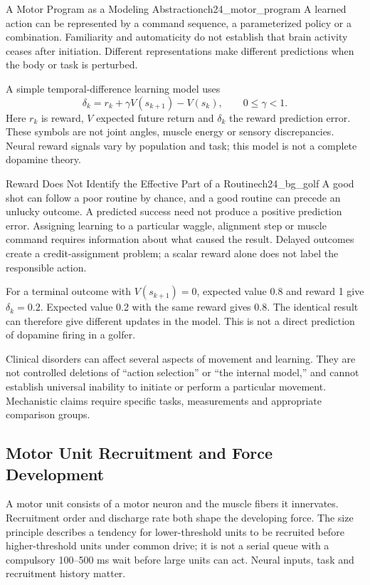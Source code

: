 \begin{definition}{A Motor Program as a Modeling Abstraction}{ch24_motor_program}
A learned action can be represented by a command sequence, a parameterized policy or a combination. Familiarity and automaticity do not establish that brain activity ceases after initiation. Different representations make different predictions when the body or task is perturbed.
\end{definition}

A simple temporal-difference learning model uses
\[
\delta_k=r_k+\gamma V(s_{k+1})-V(s_k),\qquad 0\leq\gamma<1.
\]
Here $r_k$ is reward, $V$ expected future return and $\delta_k$ the reward prediction error. These symbols are not joint angles, muscle energy or sensory discrepancies. Neural reward signals vary by population and task; this model is not a complete dopamine theory.

\begin{example}{Reward Does Not Identify the Effective Part of a Routine}{ch24_bg_golf}
A good shot can follow a poor routine by chance, and a good routine can precede an unlucky outcome. A predicted success need not produce a positive prediction error. Assigning learning to a particular waggle, alignment step or muscle command requires information about what caused the result. Delayed outcomes create a credit-assignment problem; a scalar reward alone does not label the responsible action.

For a terminal outcome with $V(s_{k+1})=0$, expected value 0.8 and reward 1 give $\delta_k=0.2$. Expected value 0.2 with the same reward gives 0.8. The identical result can therefore give different updates in the model. This is not a direct prediction of dopamine firing in a golfer.
\end{example}

Clinical disorders can affect several aspects of movement and learning. They are not controlled deletions of ``action selection'' or ``the internal model,'' and cannot establish universal inability to initiate or perform a particular movement. Mechanistic claims require specific tasks, measurements and appropriate comparison groups.

\subsection{Motor Unit Recruitment and Force Development}
\label{subsec:ch24_recruitment}
\label{princ:box:ch24_size_principle}
A motor unit consists of a motor neuron and the muscle fibers it innervates. Recruitment order and discharge rate both shape the developing force. The size principle describes a tendency for lower-threshold units to be recruited before higher-threshold units under common drive; it is not a serial queue with a compulsory 100--500 ms wait before large units can act. Neural inputs, task and recruitment history matter.

